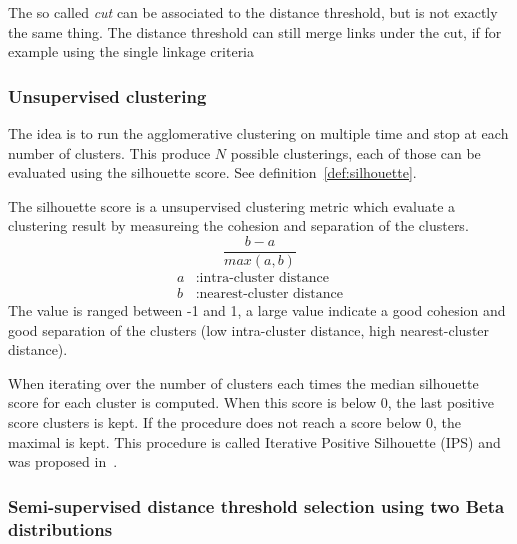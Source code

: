The so called \textit{cut} can be associated to the distance threshold, but is not exactly the same thing.
The distance threshold can still merge links under the cut, if for example using the single linkage criteria

\subsubsection{Unsupervised clustering}

The idea is to run the agglomerative clustering on multiple time and stop at each number of clusters.
This produce $N$ possible clusterings, each of those can be evaluated using the silhouette score.
See definition~\ref{def:silhouette}.

\begin{definition}
  \label{def:silhouette}
  The silhouette score is a unsupervised clustering metric which evaluate a clustering result by measureing the cohesion and separation of the clusters.
  \begin{equation}
    \frac{b - a}{max(a, b)}
  \end{equation}
  \begin{equation*}
    \begin{split}
      a&: \text{intra-cluster distance}\\
      b&: \text{nearest-cluster distance}
    \end{split}
  \end{equation*}
  The value is ranged between -1 and 1, a large value indicate a good cohesion and good separation of the clusters (low intra-cluster distance, high nearest-cluster distance).
\end{definition}

When iterating over the number of clusters each times the median silhouette score for each cluster is computed.
When this score is below 0, the last positive score clusters is kept.
If the procedure does not reach a score below 0, the maximal is kept.
This procedure is called Iterative Positive Silhouette (IPS) and was proposed in~\cite{automated_unsupervised}.

\subsubsection{Semi-supervised distance threshold selection using two Beta distributions}

